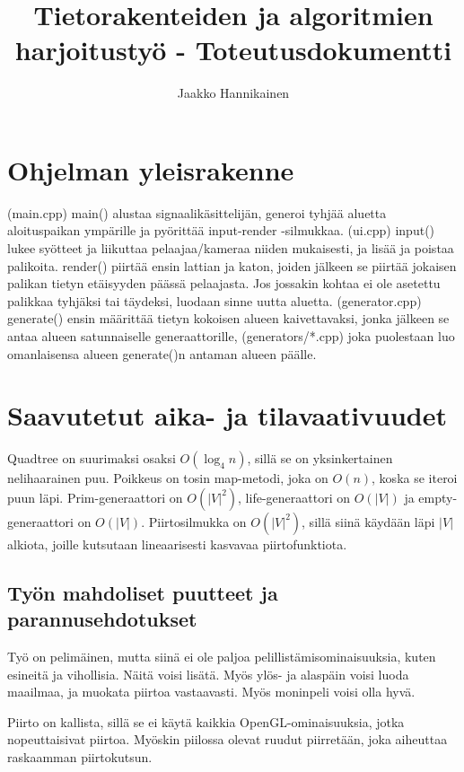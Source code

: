 \documentclass{article}
\author{Jaakko Hannikainen}
\title{Tietorakenteiden ja algoritmien harjoitustyö - Toteutusdokumentti}
\begin{document}
\maketitle

\section{Ohjelman yleisrakenne}
(main.cpp) main() alustaa signaalikäsittelijän, generoi tyhjää aluetta
aloituspaikan ympärille ja pyörittää input-render -silmukkaa. (ui.cpp) input()
lukee syötteet ja liikuttaa pelaajaa/kameraa niiden mukaisesti, ja lisää ja
poistaa palikoita. render() piirtää ensin lattian ja katon, joiden jälkeen se
piirtää jokaisen palikan tietyn etäisyyden päässä pelaajasta. Jos jossakin
kohtaa ei ole asetettu palikkaa tyhjäksi tai täydeksi, luodaan sinne uutta
aluetta. (generator.cpp) generate() ensin määrittää tietyn kokoisen alueen
kaivettavaksi, jonka jälkeen se antaa alueen satunnaiselle generaattorille,
(generators/*.cpp) joka puolestaan luo omanlaisensa alueen generate()n antaman
alueen päälle.

\section{Saavutetut aika- ja tilavaativuudet}
Quadtree on suurimaksi osaksi $O(\log_4 n)$, sillä se on yksinkertainen
nelihaarainen puu. Poikkeus on tosin map-metodi, joka on $O(n)$, koska se iteroi
puun läpi. Prim-generaattori on $O(|V|^2)$, life-generaattori on $O(|V|)$ ja
empty-generaattori on $O(|V|)$. Piirtosilmukka on $O(|V|^2)$, sillä siinä
käydään läpi $|V|$ alkiota, joille kutsutaan lineaarisesti kasvavaa
piirtofunktiota.

\subsection{Työn mahdoliset puutteet ja parannusehdotukset}
Työ on pelimäinen, mutta siinä ei ole paljoa pelillistämisominaisuuksia, kuten
esineitä ja vihollisia. Näitä voisi lisätä. Myös ylös- ja alaspäin voisi luoda
maailmaa, ja muokata piirtoa vastaavasti. Myös moninpeli voisi olla hyvä.

Piirto on kallista, sillä se ei käytä kaikkia OpenGL-ominaisuuksia, jotka
nopeuttaisivat piirtoa. Myöskin piilossa olevat ruudut piirretään, joka
aiheuttaa raskaamman piirtokutsun.
\end{document}
